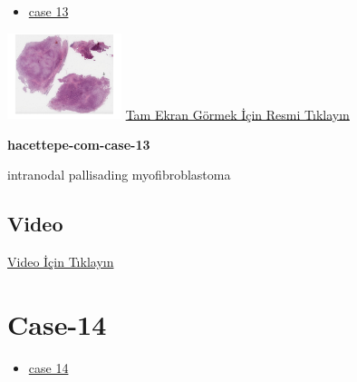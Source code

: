 \documentclass[
  letterpaper,
  DIV=11,
  numbers=noendperiod]{scrreprt}
\providecommand{\tightlist}{%
  \setlength{\itemsep}{0pt}\setlength{\parskip}{0pt}}\usepackage{longtable,booktabs,array}
\begin{document}
\begin{itemize}
\tightlist
\item
  \href{https://www.youtube.com/watch?v=TLRJ0pBrwxA\&ab_channel=KemalKosemehmetoglu}{case
  13}
\end{itemize}

\href{https://images.patolojiatlasi.com/hacettepe-com-case-13/HE.html}{\includegraphics[width=0.25\textwidth,height=\textheight]{./screenshots/hacettepe-com-case-13_screenshot.png}}
\href{https://images.patolojiatlasi.com/hacettepe-com-case-13/HE.html}{Tam
Ekran Görmek İçin Resmi Tıklayın}

\textbf{hacettepe-com-case-13}

\begin{tcolorbox}[enhanced jigsaw, left=2mm, toprule=.15mm, rightrule=.15mm, bottomrule=.15mm, leftrule=.75mm, colback=white, colframe=quarto-callout-tip-color-frame, toptitle=1mm, breakable, titlerule=0mm, colbacktitle=quarto-callout-tip-color!10!white, bottomtitle=1mm, title=\textcolor{quarto-callout-tip-color}{\faLightbulb}\hspace{0.5em}{Tanı}, arc=.35mm, opacitybacktitle=0.6, opacityback=0, coltitle=black]

intranodal pallisading myofibroblastoma

\end{tcolorbox}

\hypertarget{video-11}{%
\subsection{Video}\label{video-11}}

\href{https://www.youtube.com/watch?v=TLRJ0pBrwxA}{Video İçin Tıklayın}

\hypertarget{sec-hacettepe-case-of-the-month-case-14}{%
\section{Case-14}\label{sec-hacettepe-case-of-the-month-case-14}}

\begin{itemize}
\tightlist
\item
  \href{https://www.youtube.com/watch?v=MVZntjhry6g\&ab_channel=KemalKosemehmetoglu}{case
  14}
\end{itemize}
\end{document}
